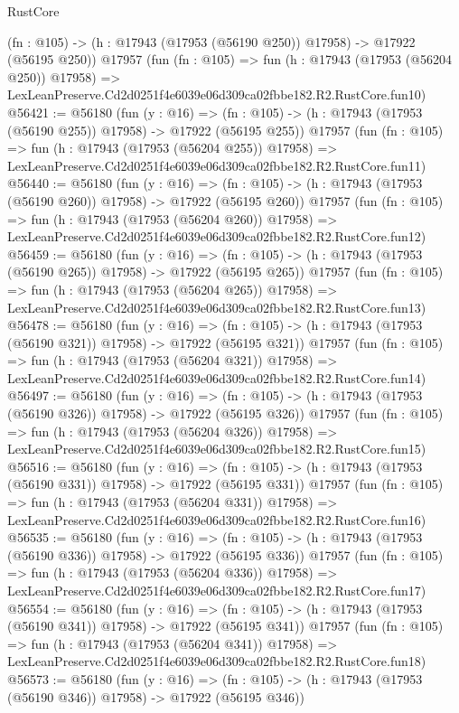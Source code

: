 \begin{lexlean}{RustCore}
\begin{coremodule}
    (fn : @105) -> (h : @17943 (@17953 (@56190 @250)) @17958) -> @17922 (@56195 @250))
    @17957
    (fun (fn : @105) =>
    fun (h : @17943 (@17953 (@56204 @250)) @17958) =>
    LexLeanPreserve.Cd2d0251f4e6039e06d309ca02fbbe182.R2.RustCore.fun10)
@56421 := @56180
    (fun (y : @16) =>
    (fn : @105) -> (h : @17943 (@17953 (@56190 @255)) @17958) -> @17922 (@56195 @255))
    @17957
    (fun (fn : @105) =>
    fun (h : @17943 (@17953 (@56204 @255)) @17958) =>
    LexLeanPreserve.Cd2d0251f4e6039e06d309ca02fbbe182.R2.RustCore.fun11)
@56440 := @56180
    (fun (y : @16) =>
    (fn : @105) -> (h : @17943 (@17953 (@56190 @260)) @17958) -> @17922 (@56195 @260))
    @17957
    (fun (fn : @105) =>
    fun (h : @17943 (@17953 (@56204 @260)) @17958) =>
    LexLeanPreserve.Cd2d0251f4e6039e06d309ca02fbbe182.R2.RustCore.fun12)
@56459 := @56180
    (fun (y : @16) =>
    (fn : @105) -> (h : @17943 (@17953 (@56190 @265)) @17958) -> @17922 (@56195 @265))
    @17957
    (fun (fn : @105) =>
    fun (h : @17943 (@17953 (@56204 @265)) @17958) =>
    LexLeanPreserve.Cd2d0251f4e6039e06d309ca02fbbe182.R2.RustCore.fun13)
@56478 := @56180
    (fun (y : @16) =>
    (fn : @105) -> (h : @17943 (@17953 (@56190 @321)) @17958) -> @17922 (@56195 @321))
    @17957
    (fun (fn : @105) =>
    fun (h : @17943 (@17953 (@56204 @321)) @17958) =>
    LexLeanPreserve.Cd2d0251f4e6039e06d309ca02fbbe182.R2.RustCore.fun14)
@56497 := @56180
    (fun (y : @16) =>
    (fn : @105) -> (h : @17943 (@17953 (@56190 @326)) @17958) -> @17922 (@56195 @326))
    @17957
    (fun (fn : @105) =>
    fun (h : @17943 (@17953 (@56204 @326)) @17958) =>
    LexLeanPreserve.Cd2d0251f4e6039e06d309ca02fbbe182.R2.RustCore.fun15)
@56516 := @56180
    (fun (y : @16) =>
    (fn : @105) -> (h : @17943 (@17953 (@56190 @331)) @17958) -> @17922 (@56195 @331))
    @17957
    (fun (fn : @105) =>
    fun (h : @17943 (@17953 (@56204 @331)) @17958) =>
    LexLeanPreserve.Cd2d0251f4e6039e06d309ca02fbbe182.R2.RustCore.fun16)
@56535 := @56180
    (fun (y : @16) =>
    (fn : @105) -> (h : @17943 (@17953 (@56190 @336)) @17958) -> @17922 (@56195 @336))
    @17957
    (fun (fn : @105) =>
    fun (h : @17943 (@17953 (@56204 @336)) @17958) =>
    LexLeanPreserve.Cd2d0251f4e6039e06d309ca02fbbe182.R2.RustCore.fun17)
@56554 := @56180
    (fun (y : @16) =>
    (fn : @105) -> (h : @17943 (@17953 (@56190 @341)) @17958) -> @17922 (@56195 @341))
    @17957
    (fun (fn : @105) =>
    fun (h : @17943 (@17953 (@56204 @341)) @17958) =>
    LexLeanPreserve.Cd2d0251f4e6039e06d309ca02fbbe182.R2.RustCore.fun18)
@56573 := @56180
    (fun (y : @16) =>
    (fn : @105) -> (h : @17943 (@17953 (@56190 @346)) @17958) -> @17922 (@56195 @346))

\end{coremodule}
\end{lexlean}

